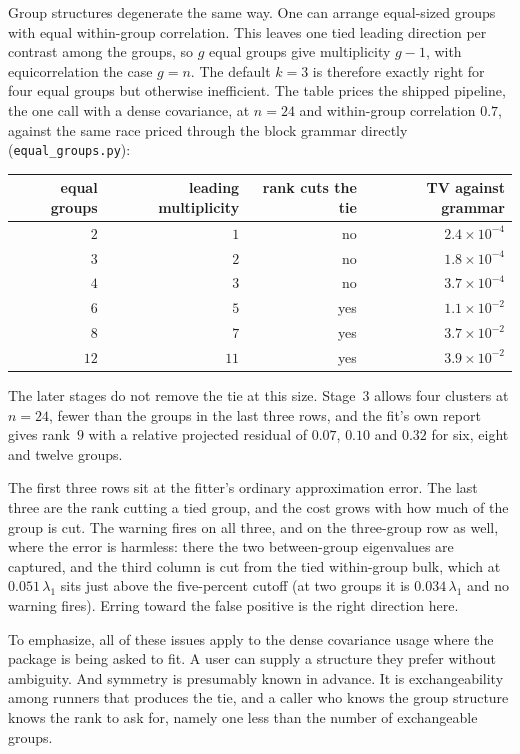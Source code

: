 \documentclass[11pt]{article}
\begin{document}
Group structures degenerate the same way. One can arrange equal-sized groups with equal within-group correlation. This leaves one tied leading direction per contrast among the groups, so $g$ equal
groups give multiplicity $g-1$, with equicorrelation the case $g=n$. The
default $k=3$ is therefore exactly right for four equal groups but otherwise inefficient. The table prices the shipped pipeline, the one call with a dense
covariance, at $n=24$ and within-group correlation
$0.7$, against the same race priced through the block grammar directly
(\texttt{equal\_groups.py}):

\begin{center}\small
\begin{tabular}{rrrr}
\toprule
equal groups & leading multiplicity & rank cuts the tie & TV against grammar\\
\midrule
$2$ & $1$ & no & $2.4\times10^{-4}$\\
$3$ & $2$ & no & $1.8\times10^{-4}$\\
$4$ & $3$ & no & $3.7\times10^{-4}$\\
$6$ & $5$ & yes & $1.1\times10^{-2}$\\
$8$ & $7$ & yes & $3.7\times10^{-2}$\\
$12$ & $11$ & yes & $3.9\times10^{-2}$\\
\bottomrule
\end{tabular}
\end{center}

The later stages do not remove the tie at this size. Stage~3 allows
four clusters at $n=24$, fewer than the groups in the last three rows,
and the fit's own report gives rank~$9$ with a relative projected
residual of $0.07$, $0.10$ and $0.32$ for six, eight and twelve groups.

The first three rows sit at the fitter's ordinary approximation error.
The last three are the rank cutting a tied group, and the cost grows with
how much of the group is cut. The warning fires on all three, and on the
three-group row as well, where the error is harmless: there the two
between-group eigenvalues are captured, and the third column is cut from
the tied within-group bulk, which at $0.051\,\lambda_1$ sits just above
the five-percent cutoff (at two groups it is $0.034\,\lambda_1$ and no
warning fires).
Erring toward the false positive is the right direction here.

To emphasize, all of these issues apply to the dense covariance usage where the package is being asked to fit. A
user can supply a structure they prefer without ambiguity. And symmetry is
presumably known in advance. It is exchangeability among runners that produces the tie, and a
caller who knows the group structure knows the rank to ask for, namely
one less than the number of exchangeable groups.
\end{document}

